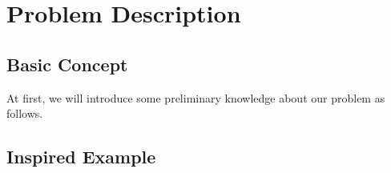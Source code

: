 \section{Problem Description}

\subsection{Basic Concept}

At first, we will introduce some preliminary knowledge about our problem as follows.

\subsection{Inspired Example}

\newpage

